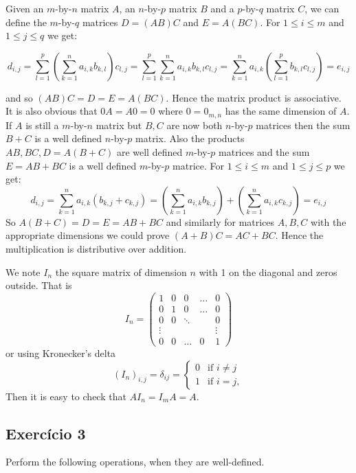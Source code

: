 Given an $m$-by-$n$ matrix $A$, an $n$-by-$p$ matrix $B$ and a $p$-by-$q$
matrix $C$, we can define the $m$-by-$q$ matrices $D = (A B)C$ and
$E = A(B C)$. For $1 \leq i \leq m$ and $1 \leq j \leq q$ we get:

    $$d_{i,j} =
    \sum_{l=1}^p \left( \sum_{k=1}^n a_{i,k} b_{k,l} \right) c_{l,j} =
    \sum_{l=1}^p \sum_{k=1}^n a_{i,k} b_{k,l} c_{l,j} =
    \sum_{k=1}^n a_{i,k} \left( \sum_{l=1}^p b_{k,l} c_{l,j} \right) =
    e_{i,j}
    $$

and so $(A B)C = D = E = A(B C)$. Hence the matrix product is associative.
It is also obvious that $0 A = A 0 = 0$ where $0 = 0_{m,n}$ has the same
dimension of $A$. If $A$ is still a $m$-by-$n$ matrix but $B,C$ are now both
$n$-by-$p$ matrices then the sum $B+C$ is a well defined $n$-by-$p$ matrix.
Also the products $A B, B C, D=A(B+C)$ are well defined $m$-by-$p$ matrices and
the sum $E = A B + B C$ is a well  defined $m$-by-$p$ matrice.
For $1 \leq i \leq m$ and $1 \leq j \leq p$ we get:
$$
    d_{i,j} = \sum_{k=1}^n a_{i,k} (b_{k,j} + c_{k,j}) =
    \left(\sum_{k=1}^n a_{i,k} b_{k,j}\right) +
    \left(\sum_{k=1}^n a_{i,k} c_{k,j}\right) = e_{i,j}
$$
So $A(B+C) = D = E = A B + B C$ and similarly for matrices $A,B,C$
with the appropriate dimensions we could prove $(A+B)C = A C + B C$.
Hence the multiplication is distributive over addition.

We note $I_n$ the square matrix
of dimension $n$ with 1 on the diagonal and zeros outside. That is
$$I_n =
    \begin{pmatrix}
    1 & 0 & 0     & \dots & 0 \\
    0 & 1 & 0     & \dots & 0 \\
    0 & 0 & \ddots &      & 0 \\
    \vdots &   &   &     & \vdots \\
    0 &  0      & \dots  &  0   & 1
    \end{pmatrix}
    $$
or using Kronecker's delta
$${(I_n)}_{i,j} =
      \delta_{ij} = \begin{cases} 0 &\text{if } i \neq j \\ 1 &\text{if } i=j, \end{cases}$$
Then it is easy to check that $A I_n = I_m A = A$.

\subsection*{Exercício 3}

Perform the following operations, when they are well-defined.

